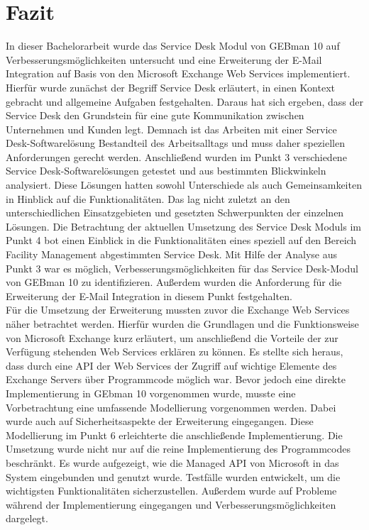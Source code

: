 \section{Fazit}

\noindent
In dieser Bachelorarbeit wurde das Service Desk Modul von GEBman 10 auf Verbesserungsmöglichkeiten untersucht und eine Erweiterung der E-Mail Integration auf Basis von den Microsoft Exchange Web Services implementiert. Hierfür wurde zunächst der Begriff Service Desk erläutert, in einen Kontext gebracht und allgemeine Aufgaben festgehalten. Daraus hat sich ergeben, dass der Service Desk den Grundstein für eine gute Kommunikation zwischen Unternehmen und Kunden legt. Demnach ist das Arbeiten mit einer Service Desk-Softwarelösung Bestandteil des Arbeitsalltags und muss daher speziellen Anforderungen gerecht werden.\newline
Anschließend wurden im Punkt 3 verschiedene Service Desk-Softwarelösungen getestet und aus bestimmten Blickwinkeln analysiert. Diese Lösungen hatten sowohl Unterschiede als auch Gemeinsamkeiten in Hinblick auf die Funktionalitäten. Das lag nicht zuletzt an den unterschiedlichen Einsatzgebieten und gesetzten Schwerpunkten der einzelnen Lösungen.\newline
Die Betrachtung der aktuellen Umsetzung des Service Desk Moduls im Punkt 4 bot einen Einblick in die Funktionalitäten eines speziell auf den Bereich Facility Management abgestimmten Service Desk. Mit Hilfe der Analyse aus Punkt 3 war es möglich, Verbesserungsmöglichkeiten für das Service Desk-Modul von GEBman 10 zu identifizieren. Außerdem wurden die Anforderung für die Erweiterung der E-Mail Integration in diesem Punkt festgehalten. \\

\noindent
Für die Umsetzung der Erweiterung mussten zuvor die Exchange Web Services näher betrachtet werden. Hierfür wurden die Grundlagen und die Funktionsweise von Microsoft Exchange kurz erläutert, um anschließend die Vorteile der zur Verfügung stehenden Web Services erklären zu können. Es stellte sich heraus, dass durch eine API der Web Services der Zugriff auf wichtige Elemente des Exchange Servers über Programmcode möglich war. Bevor jedoch eine direkte Implementierung in GEbman 10 vorgenommen wurde, musste eine Vorbetrachtung eine umfassende Modellierung vorgenommen werden. Dabei wurde auch auf Sicherheitsaspekte der Erweiterung eingegangen. Diese Modellierung im Punkt 6 erleichterte die anschließende Implementierung.\newline
Die Umsetzung wurde nicht nur auf die reine Implementierung des Programmcodes beschränkt. Es wurde aufgezeigt, wie die Managed API von Microsoft in das System eingebunden und genutzt wurde. Testfälle wurden entwickelt, um die wichtigsten Funktionalitäten sicherzustellen.  Außerdem wurde auf Probleme während der Implementierung eingegangen und Verbesserungsmöglichkeiten dargelegt.\\\\

